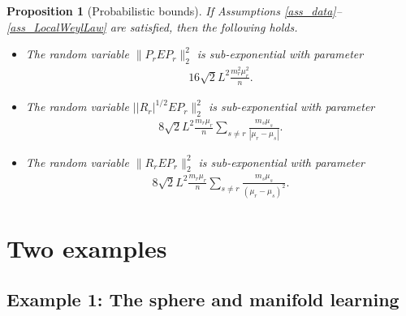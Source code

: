 \documentclass[a4paper,11pt]{article} %
\numberwithin{equation}{section}
\theoremstyle{definition}
\theoremstyle{remark}
\theoremstyle{plain}
\newtheorem{proposition}[definition]{Proposition}
\begin{document}
\begin{proposition}[Probabilistic bounds]
  \label{prp_BoundsOnTheLinearAndQuadraticTerm}
  If Assumptions \ref{ass_data}--\ref{ass_LocalWeylLaw} are satisfied, then the following holds.
\begin{itemize}
    \item[(i)] The random variable $\| P_{r} E P_{r} \|_{2}^2 $ is sub-exponential with parameter
  \begin{align}
    16\sqrt{2}L^2\frac{m_r^2\mu_r^2}{n}.
  \end{align}
  \item[(ii)] The random variable $| | R_{r} |^{1/2} E P_{r} \|_{2}^2 $ is sub-exponential with parameter
  \begin{align}
    8\sqrt{2}L^2\frac{m_r\mu_r}{n}\sum_{s\neq r}\frac{m_s\mu_s}{|\mu_r-\mu_s|}.
  \end{align}
  \item[(iii)] The random variable $\| R_{r}  E P_{r} \|_{2}^2 $ is sub-exponential with parameter
  \begin{align}
    8\sqrt{2}L^2\frac{m_r\mu_r}{n}\sum_{s\neq r}\frac{m_s\mu_s}{(\mu_r-\mu_s)^2}.
  \end{align}
\end{itemize} 
\end{proposition}









\section{Two examples}%
\label{sec_Examples}

\subsection{Example 1: The sphere and manifold learning}%
\label{ssec_TheSphere}
\end{document}

